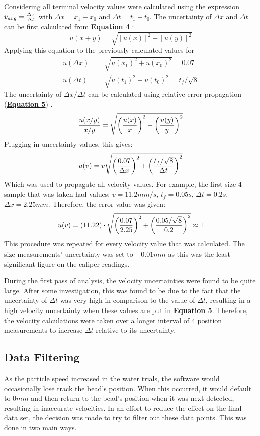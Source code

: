 \documentclass[
	letterpaper
	12pt
]{template}
\newcommand{\bref}[2]{\textbf{\hyperref[#1]{#2}}}
\begin{document}
Considering all terminal velocity values were calculated using the expression $v_{avg} = {\Delta x\over \Delta t}$ with $\Delta x = x_1 - x_0$ and $\Delta t = t_1 - t_0$. The uncertainty of $\Delta x$ and $\Delta t$ can be first calculated from \bref{eqn::sumUnc}{Equation 4} \cite{harrison_2023}:
\begin{equation}\label{eqn::sumUnc}
	u(x+y) = \sqrt{[u(x)]^2 + [u(y)]^2}
\end{equation}
Applying this equation to the previously calculated values for
\begin{align*}
	u(\Delta x) &= \sqrt{u(x_1)^2 + u(x_0)^2} = 0.07\\
	u(\Delta t) &= \sqrt{u(t_1)^2 + u(t_0)^2} = {t_f/ \sqrt 8}
\end{align*}
The uncertainty of $\Delta x/\Delta t$ can be calculated using relative error propagation (\bref{eqn::relError}{Equation 5}) \cite{harrison_2023}.
\begin{equation}\label{eqn::relError}
	{u(x/y)\over x/y} = \sqrt{\left({u(x)\over x}\right)^2+\left({u(y)\over y}\right)^2}
\end{equation}
Plugging in uncertainty values, this gives:
\[u(v) = v\sqrt{\left({0.07\over \Delta x}\right)^2+\left({t_f/\sqrt{8}\over \Delta t}\right)^2}\]
Which was used to propagate all velocity values. For example, the first size 4 sample that was taken had values: $v = 11.2mm/s$, $t_f = 0.05s$, $\Delta t = 0.2s$, $\Delta x = 2.25mm$. Therefore, the error value was given:
\[u(v) = (11.22) \cdot \sqrt{\left({0.07\over 2.25}\right)^2+\left({0.05/\sqrt{8}\over 0.2}\right)^2} \approx 1\]
This procedure was repeated for every velocity value that was calculated. The size measurements' uncertainty was set to $\pm0.01\unit{mm}$ as this was the least significant figure on the caliper readings.\vspace{\baselineskip}

During the first pass of analysis, the velocity uncertainties were found to be quite large. After some investigation, this was found to be due to the fact that the uncertainty of $\Delta t$ was very high in comparison to the value of $\Delta t$, resulting in a high velocity uncertainty when these values are put in \bref{eqn::relError}{Equation 5}. Therefore, the velocity calculations were taken over a longer interval of $4$ position measurements to increase $\Delta t$ relative to its uncertainty.
\subsection{Data Filtering}\label{sec::filtering}
As the particle speed increased in the water trials, the software would occasionally lose track the bead's position. When this occurred, it would default to $0mm$ and then return to the bead's position when it was next detected, resulting in inaccurate velocities. In an effort to reduce the effect on the final data set, the decision was made to try to filter out these data points. This was done in two main ways.\vspace{\baselineskip}
\end{document}
